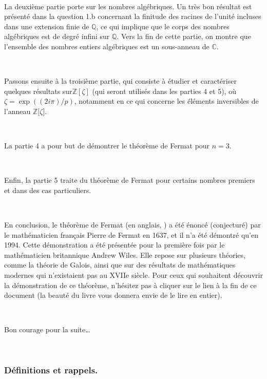 \

La deuxi{\`e}me partie porte sur les nombres alg{\'e}briques. Un tr{\`e}s bon
r{\'e}sultat est pr{\'e}sent{\'e} dans la question 1.b concernant la finitude
des racines de l'unit{\'e} incluses dans une extension finie de $\mathbb{Q}$,
ce qui implique que le corps des nombres alg{\'e}briques est de degr{\'e}
infini sur $\mathbb{Q}$. Vers la fin de cette partie, on montre que l'ensemble
des nombres entiers alg{\'e}briques est un sous-anneau de $\mathbb{C}$.

\

Passons ensuite {\`a} la troisi{\`e}me partie, qui consiste {\`a} {\'e}tudier
et caract{\'e}riser quelques r{\'e}sultats sur$\mathbb{Z}[\zeta]$ (qui seront
utilis{\'e}s dans les parties 4 et 5), o{\`u} $\zeta = \exp ((2 i \pi) / p)$,
notamment en ce qui concerne les {\'e}l{\'e}ments inversibles de l'anneau
$\mathbb{Z}[\zeta$].

\

La partie 4 a pour but de d{\'e}montrer le th{\'e}or{\`e}me de Fermat pour $n
= 3$.

\

Enfin, la partie 5 traite du th{\'e}or{\`e}me de Fermat pour certains nombres
premiers et dans des cas particuliers.

\

En conclusion, le th{\'e}or{\`e}me de Fermat (en anglais, {}) a {\'e}t{\'e} {\'e}nonc{\'e} (conjectur{\'e}) par le
math{\'e}maticien fran{\c c}ais Pierre de Fermat en 1637, et il n'a
{\'e}t{\'e} d{\'e}montr{\'e} qu'en 1994. Cette d{\'e}monstration a {\'e}t{\'e}
pr{\'e}sent{\'e}e pour la premi{\`e}re fois par le math{\'e}maticien
britannique Andrew Wiles. Elle repose sur plusieurs th{\'e}ories, comme la
th{\'e}orie de Galois, ainsi que sur des r{\'e}sultats de math{\'e}matiques
modernes qui n'existaient pas au XVIIe si{\`e}cle. Pour ceux qui souhaitent
d{\'e}couvrir la d{\'e}monstration de ce th{\'e}or{\`e}me, n'h{\'e}sitez pas
{\`a} cliquer sur le lien {\`a} la fin de ce document (la beaut{\'e} du livre
vous donnera envie de le lire en entier).

\

Bon courage pour la suite{\ldots}

\

\subsubsection*{D{\'e}finitions et rappels.}

\

